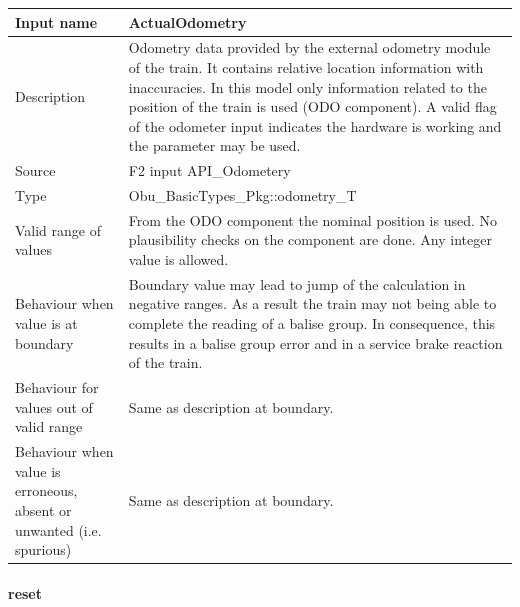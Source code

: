 \begin{longtable}{p{}p{}}
\toprule
Input name				& ActualOdometry \\
\midrule
Description				& Odometry data provided by the external odometry module of the train. It contains relative location information with inaccuracies. In this model only information related to the position of the train is used (ODO component). A valid flag of the odometer input indicates the hardware is working and the parameter may be used.\\
\midrule
Source					& F2 input API\_Odometery \\ 
\midrule
Type					& Obu\_BasicTypes\_Pkg::odometry\_T \\
\midrule
Valid range of values	& From the ODO component the nominal position is used. No plausibility checks on the component are done. Any integer value is allowed. \\
\midrule
Behaviour when value is at boundary	& Boundary value may lead to jump of the calculation in negative ranges. As a result the train may not being able to complete the reading of a balise group. In consequence, this results in a balise group error and in a service brake reaction of the train.\\
\midrule
Behaviour for values out of valid range	& Same as description at boundary.\\
\midrule
Behaviour when value is erroneous, absent or unwanted (i.e. spurious) & Same as description at boundary.\\

\bottomrule
\end{longtable}

\paragraph{reset}

